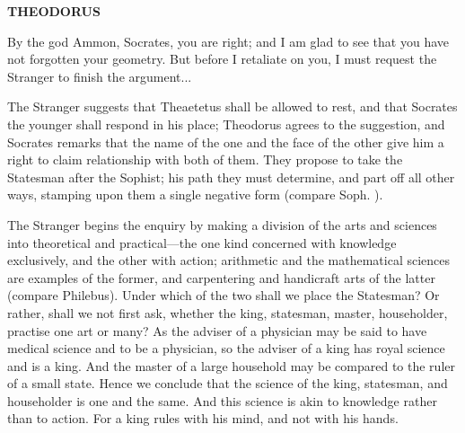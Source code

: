 \documentclass[11pt,letter]{article}
\begin{document}
\par \textbf{THEODORUS}
\par   By the god Ammon, Socrates, you are right; and I am glad to see that you have not forgotten your geometry. But before I retaliate on you, I must request the Stranger to finish the argument...

\par  The Stranger suggests that Theaetetus shall be allowed to rest, and that Socrates the younger shall respond in his place; Theodorus agrees to the suggestion, and Socrates remarks that the name of the one and the face of the other give him a right to claim relationship with both of them. They propose to take the Statesman after the Sophist; his path they must determine, and part off all other ways, stamping upon them a single negative form (compare Soph. ).

\par  The Stranger begins the enquiry by making a division of the arts and sciences into theoretical and practical—the one kind concerned with knowledge exclusively, and the other with action; arithmetic and the mathematical sciences are examples of the former, and carpentering and handicraft arts of the latter (compare Philebus). Under which of the two shall we place the Statesman? Or rather, shall we not first ask, whether the king, statesman, master, householder, practise one art or many? As the adviser of a physician may be said to have medical science and to be a physician, so the adviser of a king has royal science and is a king. And the master of a large household may be compared to the ruler of a small state. Hence we conclude that the science of the king, statesman, and householder is one and the same. And this science is akin to knowledge rather than to action. For a king rules with his mind, and not with his hands.
\end{document}
